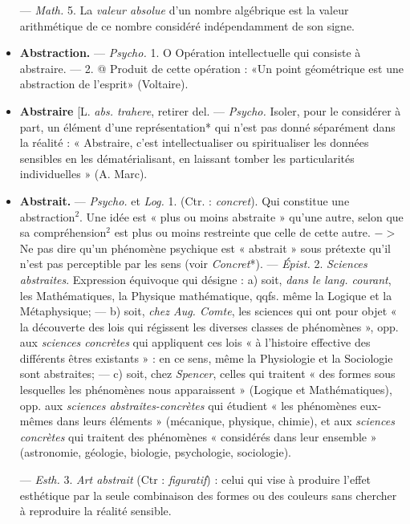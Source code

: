 \begin{itemize}[leftmargin=1cm, label=, itemsep=1pt]
 — \textsf{\textit {Math.}} 5. La {\it valeur absolue} d’un
nombre algébrique est la valeur
arithmétique de ce nombre considéré
indépendamment de son signe.

\item {\bf Abstraction.} — \textsf{\textit {Psycho.}} 1. O Opération
intellectuelle qui consiste à
abstraire. — 2. @ Produit de cette
opération : «Un point géométrique est
une abstraction de l'esprit» (Voltaire).

\item {\bf Abstraire} [L. {\it abs. trahere}, retirer del.
— \textsf{\textit {Psycho.}} Isoler, pour le considérer
à part, un élément d'une représentation*
qui n'est pas donné séparément
dans la réalité : « Abstraire,
c’est intellectualiser ou spiritualiser
les données sensibles en les dématérialisant,
en laissant tomber les
particularités individuelles » (A.
Marc).

\item {\bf Abstrait.} — \textsf{\textit {Psycho.}} et \textsf{\textit {Log.}} 1. (Ctr. :
{\it concret}). Qui constitue une abstraction$^2$.
Une idée est « plus ou moins
abstraite » qu'une autre, selon que
sa compréhension$^2$ est plus ou
moins restreinte que celle de cette
autre. $->$ Ne pas dire qu’un phénomène
psychique est « abstrait »
sous prétexte qu'il n’est pas perceptible
par les sens (voir {\it Concret}*). —
\textsf{\textit {Épist.}} 2. {\it Sciences abstraites}. Expression
équivoque qui désigne : a) soit,
{\it dans le lang. courant}, les Mathématiques,
la Physique mathématique,
qqfs. même la Logique et la Métaphysique;
— b) soit, {\it chez Aug.
Comte}, les sciences qui ont pour
objet « la découverte des lois qui
régissent les diverses classes de phénomènes »,
opp. aux {\it sciences concrètes}
qui appliquent ces lois « à l’histoire
effective des différents êtres existants » :
en ce sens, même la Physiologie
et la Sociologie sont abstraites;
— c) soit, chez {\it Spencer}, celles qui
traitent « des formes sous lesquelles
les phénomènes nous apparaissent »
(Logique et Mathématiques), opp.
aux {\it sciences abstraites-concrètes} qui
étudient « les phénomènes eux-mêmes
dans leurs éléments » (mécanique,
physique, chimie), et aux
{\it sciences concrètes} qui traitent des
phénomènes « considérés dans leur
ensemble » (astronomie, géologie,
biologie, psychologie, sociologie).

— \textsf{\textit {Esth.}} 3. {\it Art abstrait} (Ctr : {\it figuratif}) : celui qui vise à produire
l'effet esthétique par la seule combinaison des formes ou des couleurs
sans chercher à reproduire la réalité
sensible.


\end{itemize}
